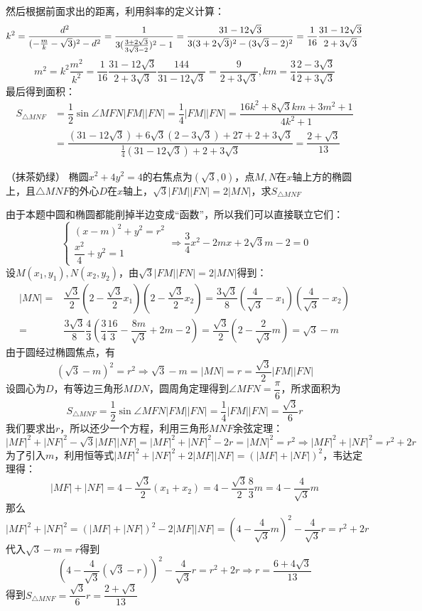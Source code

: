 \begin{solution}
    然后根据前面求出的距离，利用斜率的定义计算：
    \[k^2=\dfrac{d^2}{(-\frac{m}{k}-\sqrt3)^2-d^2}=\dfrac{1}{3(\frac{3+2\sqrt3}{3\sqrt3-2})^2-1}=\dfrac{31-12\sqrt3}{3(3+2\sqrt3)^2-(3\sqrt3-2)^2}=\dfrac{1}{16}\dfrac{31-12\sqrt3}{2+3\sqrt3}\vspace{-5pt}\]
    \[m^2=k^2\dfrac{m^2}{k^2}=\dfrac{1}{16}\dfrac{31-12\sqrt3}{2+3\sqrt3}\dfrac{144}{31-12\sqrt3}=\dfrac{9}{2+3\sqrt3},km=\dfrac34\dfrac{2-3\sqrt3}{2+3\sqrt3}\]\vspace{-10pt}
    最后得到面积：
    \begin{align*}
        S_{\triangle{MNF}}&=\dfrac12\sin\angle{MFN}|FM||FN|=\dfrac{1}{4}|FM||FN|=\dfrac{16k^2+8\sqrt{3}km+3m^2+1}{4k^2+1}\\
        &=\dfrac{(31-12\sqrt3)+6\sqrt{3}(2-3\sqrt3)+27+2+3\sqrt3}{\frac14(31-12\sqrt3)+2+3\sqrt3}=\dfrac{2+\sqrt3}{13}
    \end{align*}
\end{solution}
\newpage
\begin{example}{（抹茶奶绿）}{}
    椭圆$x^2+4y^2=4$的右焦点为$(\sqrt3,0)$，点$M,N$在$x$轴上方的椭圆上，且$\triangle{MNF}$的外心$D$在$x$轴上，$\sqrt{3}|FM||FN|=2|MN|$，求$S_{\triangle{MNF}}$
\end{example}
\begin{solution}
    由于本题中圆和椭圆都能削掉半边变成“函数”，所以我们可以直接联立它们：
    \[\begin{cases}(x-m)^2+y^2=r^2\\\dfrac{x^2}{4}+y^2=1\end{cases}\Rightarrow \dfrac{3}{4}x^2-2mx+2\sqrt{3}m-2=0\]
    设$M(x_1,y_1),N(x_2,y_2)$，由$\sqrt{3}|FM||FN|=2|MN|$得到：
    \begin{align*}|MN|=&\dfrac{\sqrt3}{2}\left(2-\dfrac{\sqrt3}{2}x_1\right)\left(2-\dfrac{\sqrt3}{2}x_2\right)=\dfrac{3\sqrt3}{8}\left(\dfrac{4}{\sqrt3}-x_1\right)\left(\dfrac{4}{\sqrt3}-x_2\right)\\=&\dfrac{3\sqrt3}{8}\dfrac43\left(\dfrac{3}{4}\dfrac{16}{3}-\dfrac{8m}{\sqrt3}+2m-2\right)
    =\dfrac{\sqrt3}{2}(2-\dfrac{2}{\sqrt{3}}m)=\sqrt3-m\end{align*}
    由于圆经过椭圆焦点，有\[(\sqrt3-m)^2=r^2\Rightarrow \sqrt3-m=|MN|=r=\dfrac{\sqrt{3}}{2}|FM||FN|\]
    设圆心为$D$，有等边三角形$MDN$，圆周角定理得到$\angle{MFN}=\dfrac{\pi}{6}$，所求面积为
    \[S_{\triangle{MNF}}=\dfrac12\sin\angle{MFN}|FM||FN|=\dfrac{1}{4}|FM||FN|=\dfrac{\sqrt3}{6}r\]
    我们要求出$r$，所以还少一个方程，利用三角形$MNF$余弦定理：
    \[|MF|^2+|NF|^2-\sqrt3|MF||NF|=|MF|^2+|NF|^2-2r=|MN|^2=r^2\Rightarrow |MF|^2+|NF|^2=r^2+2r\]
    为了引入$m$，利用恒等式$|MF|^2+|NF|^2+2|MF||NF|=(|MF|+|NF|)^2$，韦达定理得：
    \[|MF|+|NF|=4-\dfrac{\sqrt3}{2}(x_1+x_2)=4-\dfrac{\sqrt3}{2}\dfrac{8}{3}m=4-\dfrac{4}{\sqrt3}m\]
    那么\[|MF|^2+|NF|^2=(|MF|+|NF|)^2-2|MF||NF|=(4-\dfrac{4}{\sqrt3}m)^2-\dfrac{4}{\sqrt3}r=r^2+2r\]
    代入$\sqrt3-m=r$得到\[\left(4-\dfrac{4}{\sqrt3}(\sqrt3-r)\right)^2-\dfrac{4}{\sqrt3}r=r^2+2r\Rightarrow r=\dfrac{6+4\sqrt3}{13}\]
    得到$S_{\triangle{MNF}}=\dfrac{\sqrt3}{6}r=\dfrac{2+\sqrt3}{13}$
\end{solution}
